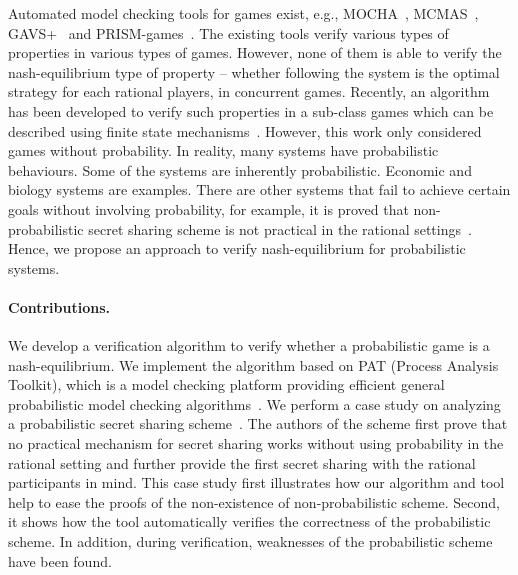 Automated model checking tools for games exist, e.g., MOCHA~\cite{AHM98}, MCMAS~\cite{LQR09}, GAVS+~\cite{CKL11} and PRISM-games~\cite{CFK13}. The existing tools verify various types of properties in various types of games. However, none of them is able to verify the nash-equilibrium type of property -- whether following the system is the optimal strategy for each rational players, in concurrent games. Recently, an algorithm has been developed to verify such properties in a sub-class games which can be described using finite state mechanisms~\cite{MMS08}. However, this work only considered games without probability. In reality, many systems have probabilistic behaviours.
Some of the systems are inherently probabilistic. Economic and biology systems are examples. There are other systems that fail to achieve certain goals without involving probability, for example, it is proved that non-probabilistic secret sharing scheme is not practical in the rational settings~\cite{HT04}. Hence, we propose an approach to verify nash-equilibrium for probabilistic systems. 

\paragraph{Contributions.}
We develop a verification algorithm to verify whether a probabilistic game is a nash-equilibrium. 
We implement the algorithm based on PAT (Process Analysis Toolkit), which is a model checking platform providing efficient general probabilistic model checking algorithms~\cite{PAT}.
We perform a case study on analyzing a probabilistic secret sharing scheme~\cite{HT04}. The authors of the scheme first prove that no practical mechanism for secret sharing works without using probability in the rational setting and further provide the first secret sharing with the rational participants in mind. 
This case study first illustrates how our algorithm and tool help to ease the proofs of the non-existence of non-probabilistic scheme. Second, it shows how the tool automatically verifies the correctness of the probabilistic scheme. In addition, during verification, weaknesses of the probabilistic scheme have been found.